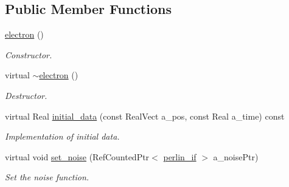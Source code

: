 \subsection*{Public Member Functions}
\begin{DoxyCompactItemize}
\item 
\hyperlink{classair__bolsig_1_1electron_a92e4c067780a4c788ac8c4333473612c}{electron} ()
\begin{DoxyCompactList}\small\item\em Constructor. \end{DoxyCompactList}\item 
virtual \hyperlink{classair__bolsig_1_1electron_af64ba24f60db41052054948676596c5c}{$\sim$electron} ()
\begin{DoxyCompactList}\small\item\em Destructor. \end{DoxyCompactList}\item 
virtual Real \hyperlink{classair__bolsig_1_1electron_a2025cd5cc5802fd11f299c01f5ef8d8f}{initial\+\_\+data} (const Real\+Vect a\+\_\+pos, const Real a\+\_\+time) const 
\begin{DoxyCompactList}\small\item\em Implementation of initial data. \end{DoxyCompactList}\item 
virtual void \hyperlink{classair__bolsig_1_1electron_abf93b1dc29b27adfd9bf5e4f96ffb3c2}{set\+\_\+noise} (Ref\+Counted\+Ptr$<$ \hyperlink{classperlin__if}{perlin\+\_\+if} $>$ a\+\_\+noise\+Ptr)
\begin{DoxyCompactList}\small\item\em Set the noise function. \end{DoxyCompactList}\end{DoxyCompactItemize}
